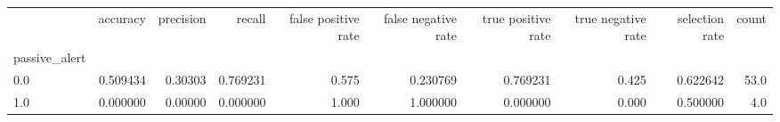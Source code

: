 \begin{tabular}{lrrrrrrrrr}
\toprule
{} &  accuracy &  precision &    recall &  false positive rate &  false negative rate &  true positive rate &  true negative rate &  selection rate &  count \\
passive\_alert &           &            &           &                      &                      &                     &                     &                 &        \\
\midrule
0.0           &  0.509434 &    0.30303 &  0.769231 &                0.575 &             0.230769 &            0.769231 &               0.425 &        0.622642 &   53.0 \\
1.0           &  0.000000 &    0.00000 &  0.000000 &                1.000 &             1.000000 &            0.000000 &               0.000 &        0.500000 &    4.0 \\
\bottomrule
\end{tabular}
